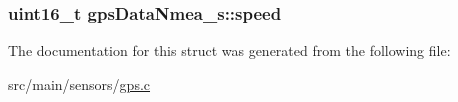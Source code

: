 \hypertarget{structgpsDataNmea__s_ac3db9cac6a859cae7a8523edbe19eada}{
\subsubsection[{speed}]{\setlength{\rightskip}{0pt plus 5cm}uint16\+\_\+t gps\+Data\+Nmea\+\_\+s\+::speed}}\label{structgpsDataNmea__s_ac3db9cac6a859cae7a8523edbe19eada}


The documentation for this struct was generated from the following file\+:\begin{DoxyCompactItemize}
\item 
src/main/sensors/\hyperlink{gps_8c}{gps.\+c}\end{DoxyCompactItemize}
